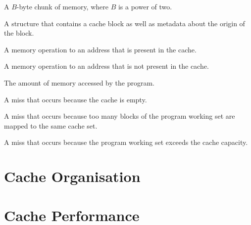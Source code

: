\begin{definition}
  A $B$-byte chunk of memory, where $B$ is a power of two.
\end{definition}

\begin{definition}
  A structure that contains a cache block as well as metadata about
  the origin of the block.
\end{definition}

\begin{definition}
  A memory operation to an address that is present in the cache.
\end{definition}

\begin{definition}
  A memory operation to an address that is not present in the cache.
\end{definition}

\begin{definition}
  The amount of memory accessed by the program.
\end{definition}

\begin{definition}
  A miss that occurs because the cache is empty.
\end{definition}

\begin{definition}
  A miss that occurs because too many blocks of the program working
  set are mapped to the same cache set.
\end{definition}

\begin{definition}
  A miss that occurs because the program working set exceeds the cache
  capacity.
\end{definition}

\section{Cache Organisation}

\section{Cache Performance}

